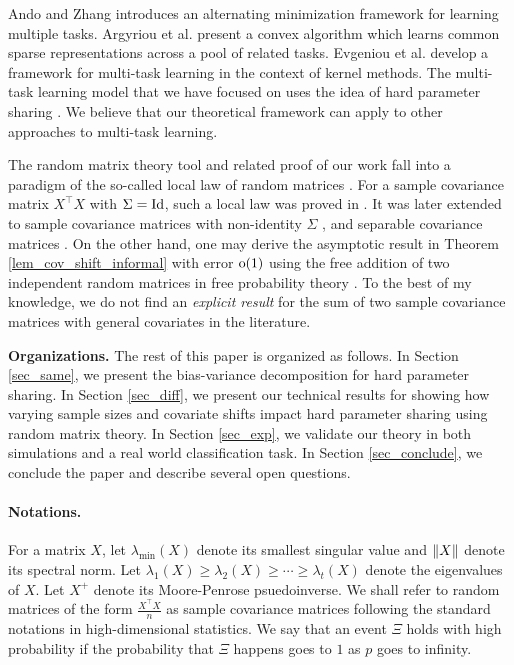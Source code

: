 Ando and Zhang \cite{AZ05} introduces an alternating minimization framework for learning multiple tasks.
Argyriou et al. \cite{AEP08} present a convex algorithm which learns common sparse representations across a pool of related tasks.
Evgeniou et al. \cite{EMP05} develop a framework for multi-task learning in the context of kernel methods.
The multi-task learning model that we have focused on uses the idea of hard parameter sharing \cite{C93,KD12,R17}.
We believe that our theoretical framework can apply to other approaches to multi-task learning.

The random matrix theory tool and related proof of our work fall into a paradigm of the so-called local law of random matrices \cite{erdos2017dynamical}.
For a sample covariance matrix $X^\top X$ with $\Sigma=\operatorname{Id}$, such a local law was proved in \cite{isotropic}.
It was later extended to sample covariance matrices with non-identity $\Sigma$ \cite{Anisotropic}, and separable covariance matrices \cite{yang2019spiked}. On the other hand, one may derive the asymptotic result in Theorem \ref{lem_cov_shift_informal} with error $\operatorname{o}(1)$ using the free addition of two independent random matrices in free probability theory \cite{nica2006lectures}. To the best of my knowledge, we do not find an {\it explicit result} for the sum of two sample covariance matrices with general covariates in the literature.

\smallskip
\noindent\textbf{Organizations.}
The rest of this paper is organized as follows.
In Section \ref{sec_same}, we present the bias-variance decomposition for hard parameter sharing.
In Section \ref{sec_diff}, we present our technical results for showing how varying sample sizes and covariate shifts impact hard parameter sharing using random matrix theory.
In Section \ref{sec_exp}, we validate our theory in both simulations and a real world classification task.
In Section \ref{sec_conclude}, we conclude the paper and describe several open questions.

\paragraph{Notations.}
For a matrix $X$, let $\lambda_{\min}(X)$ denote its smallest singular value and $\|X\|$ denote its spectral norm.
Let $\lambda_1(X) \ge \lambda_2(X) \ge \cdots \ge \lambda_t(X)$ denote the eigenvalues of $X$.
Let $X^+$ denote its Moore-Penrose psuedoinverse.
We shall refer to random matrices of the form $\frac {X^\top X} n$ as sample covariance matrices following the standard notations in high-dimensional statistics.
We say that an event $\Xi$ holds with high probability if the probability that $\Xi$ happens goes to $1$ as $p$ goes to infinity.
